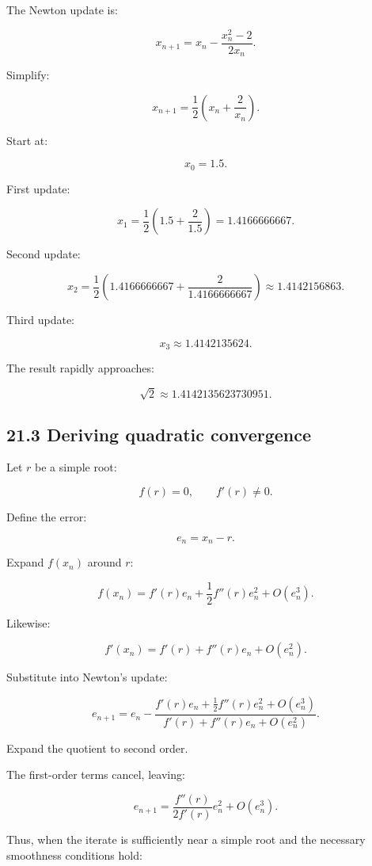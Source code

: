 The Newton update is:

\[ x_{n+1} = x_n-\frac{x_n^2-2}{2x_n}. \]

Simplify:

\[ \boxed{ x_{n+1}= \frac12\left(x_n+\frac2{x_n}\right) }. \]

Start at:

\[ x_0=1.5. \]

First update:

\[ x_1= \frac12\left(1.5+\frac2{1.5}\right) = \boxed{1.4166666667}. \]

Second update:

\[ x_2= \frac12\left(1.4166666667+\frac2{1.4166666667}\right) \approx \boxed{1.4142156863}. \]

Third update:

\[ x_3\approx1.4142135624. \]

The result rapidly approaches:

\[ \sqrt2\approx1.4142135623730951. \]

\subsection{21.3 Deriving quadratic convergence}\label{02-foundations-ii-ch028-deriving-quadratic-convergence}

\hypertarget{02-foundations-ii-ch028-deriving-quadratic-convergence}{}

Let \(r\) be a simple root:

\[ f(r)=0,\qquad f'(r)\ne0. \]

Define the error:

\[ e_n=x_n-r. \]

Expand \(f(x_n)\) around \(r\):

\[ f(x_n) = f'(r)e_n+ \frac12f''(r)e_n^2+ O(e_n^3). \]

Likewise:

\[ f'(x_n) = f'(r)+f''(r)e_n+O(e_n^2). \]

Substitute into Newton's update:

\[ e_{n+1} = e_n- \frac{ f'(r)e_n+\frac12f''(r)e_n^2+O(e_n^3) }{ f'(r)+f''(r)e_n+O(e_n^2) }. \]

Expand the quotient to second order.

The first-order terms cancel, leaving:

\[ \boxed{ e_{n+1} = \frac{f''(r)}{2f'(r)}e_n^2 + O(e_n^3) }. \]

Thus, when the iterate is sufficiently near a simple root and the necessary smoothness conditions hold:

